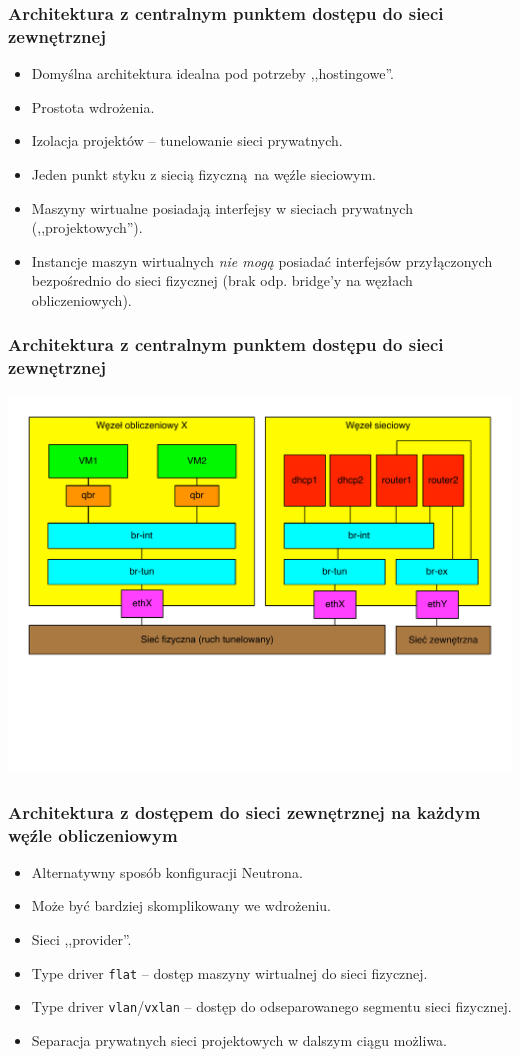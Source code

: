 \documentclass[dvipsnames,table]{beamer}
\begin{document}
\begin{frame}
\frametitle{Architektura z centralnym punktem dostępu do sieci zewnętrznej}
\begin{itemize}
	\item Domyślna architektura idealna pod potrzeby ,,hostingowe''. 
	\item Prostota wdrożenia.
	\item Izolacja projektów -- tunelowanie sieci prywatnych.
	\item Jeden punkt styku z siecią fizyczną na węźle sieciowym.
	\item Maszyny wirtualne posiadają interfejsy w sieciach prywatnych (,,projektowych'').
	\item Instancje maszyn wirtualnych {\em nie mogą} posiadać interfejsów przyłączonych bezpośrednio do sieci fizycznej (brak odp. bridge'y na węzłach obliczeniowych).
\end{itemize}
\end{frame}

\begin{frame}
\frametitle{Architektura z centralnym punktem dostępu do sieci zewnętrznej}
\includegraphics[width=1.00\textwidth]{img-neutron-tenantonly.pdf}
\end{frame}

\begin{frame}
\frametitle{Architektura z dostępem do sieci zewnętrznej na każdym węźle obliczeniowym}
\begin{itemize}
	\item Alternatywny sposób konfiguracji Neutrona.
	\item Może być bardziej skomplikowany we wdrożeniu.
	\item Sieci ,,provider''.
	\item Type driver {\tt flat} -- dostęp maszyny wirtualnej do sieci fizycznej.
	\item Type driver {\tt vlan}/{\tt vxlan} -- dostęp do odseparowanego segmentu sieci fizycznej.
	\item Separacja prywatnych sieci projektowych w dalszym ciągu możliwa.
\end{itemize}
\end{frame}
\end{document}
